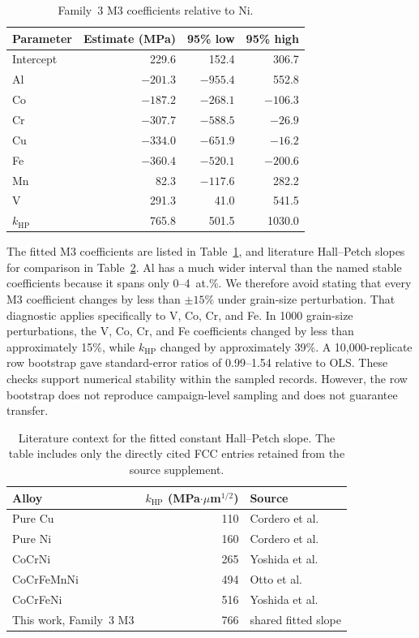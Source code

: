 \documentclass[a4paper,11pt]{article}
\begin{document}
\begin{table}[H]
\centering
\caption{Family~3 M3 coefficients relative to Ni.}
\label{tab:m3}
\begin{tabular}{lrrr}
\toprule
Parameter & Estimate (MPa) & 95\% low & 95\% high \\
\midrule
Intercept & 229.6 & 152.4 & 306.7 \\
Al & $-201.3$ & $-955.4$ & 552.8 \\
Co & $-187.2$ & $-268.1$ & $-106.3$ \\
Cr & $-307.7$ & $-588.5$ & $-26.9$ \\
Cu & $-334.0$ & $-651.9$ & $-16.2$ \\
Fe & $-360.4$ & $-520.1$ & $-200.6$ \\
Mn & 82.3 & $-117.6$ & 282.2 \\
V & 291.3 & 41.0 & 541.5 \\
$k_{\mathrm{HP}}$ & 765.8 & 501.5 & 1030.0 \\
\bottomrule
\end{tabular}
\end{table}

The fitted M3 coefficients are listed in Table~\ref{tab:m3}, and literature Hall--Petch slopes for comparison in Table~\ref{tab:khplit}. Al has a much wider interval than the named stable coefficients because it spans only 0--4~at.\%. We therefore avoid stating that every M3 coefficient changes by less than $\pm15\%$ under grain-size perturbation. That diagnostic applies specifically to V, Co, Cr, and Fe. In 1000 grain-size perturbations, the V, Co, Cr, and Fe coefficients changed by less than approximately 15\%, while $k_{\mathrm{HP}}$ changed by approximately 39\%. A 10,000-replicate row bootstrap gave standard-error ratios of 0.99--1.54 relative to OLS. These checks support numerical stability within the sampled records. However, the row bootstrap does not reproduce campaign-level sampling and does not guarantee transfer.

\begin{table}[H]
\centering
\caption{Literature context for the fitted constant Hall--Petch slope. The table includes only the directly cited FCC entries retained from the source supplement.}
\label{tab:khplit}
\small
\begin{tabular}{lrl}
\toprule
Alloy & $k_{\mathrm{HP}}$ (MPa$\cdot\mu$m$^{1/2}$) & Source \\
\midrule
Pure Cu & 110 & Cordero et al.~\cite{Cordero2016} \\
Pure Ni & 160 & Cordero et al.~\cite{Cordero2016} \\
CoCrNi & 265 & Yoshida et al.~\cite{Yoshida2017} \\
CoCrFeMnNi & 494 & Otto et al.~\cite{Otto2013} \\
CoCrFeNi & 516 & Yoshida et al.~\cite{Yoshida2019acta} \\
This work, Family~3 M3 & 766 & shared fitted slope \\
\bottomrule
\end{tabular}
\end{table}
\end{document}
